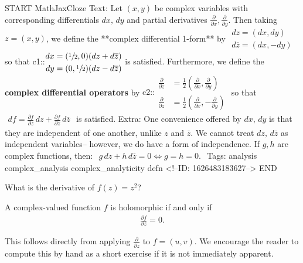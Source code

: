 \documentclass{memoir}
\begin{document}
\begin{anki}
START
MathJaxCloze
Text: Let \((x,y)\) be complex variables with corresponding differentials \(dx , \,d y\) and partial derivatives \(\frac{\partial }{\partial x} , \frac{\partial }{\partial y} \). Then taking \(z = (x,y)\), we define the **complex differential 1-form** by
\(\begin{align*}
  	dz = (dx, dy)\\
  	d \overline{z} = (dx,-dy)
  \end{align*}\)
so that
{{c1::\(\begin{align*}
      	dx = (\sfrac{1}{2},0) (dz + d \overline{z})\\
      	dy = (0, \sfrac{1}{2}) (dz - d \overline{z})
        \end{align*}\)}}
is satisfied. Furthermore, we define the \textbf{complex differential operators} by
{{c2::\(\begin{align*}
        	\frac{\partial }{\partial z} &= \frac{1}{2}\left( \frac{\partial }{\partial x} , \frac{\partial }{\partial y}  \right)\\
        	\frac{\partial }{\partial \overline{z}} &= \frac{1}{2} \left( \frac{\partial }{\partial x} , - \frac{\partial }{\partial y}  \right) 
        \end{align*}\)}} 
so that
\(\begin{align*}
  	df = \frac{\partial f}{\partial z} \,d z + \frac{\partial f}{\partial \overline{z}} \,d \overline{z}
  \end{align*}\)
is satisfied.
Extra: One convenience offered by \(dx,\,d y\) is that they are independent of one another, unlike \(z\) and \(\overline{z}\). We cannot treat \(dz,\,d \overline{z}\) as independent variables-- however, we do have a form of independence. If \(g,h\) are complex functions, then:
\(\begin{align*}
  	g \,d z + h \,d \overline{z} = 0 \iff g= h = 0.
  \end{align*}\)
Tags: analysis complex_analysis complex_analyticity defn
<!--ID: 1626483183627-->
END
\end{anki}


\begin{exmp}
	What is the derivative of \(f(z) = z^2 \)?
\end{exmp}

\begin{prop}
	A complex-valued function \(f\) is holomorphic if and only if
	\begin{align*}
		\frac{\partial f}{\partial \overline{z}} = 0.
	\end{align*}
\end{prop}
This follows directly from applying \(\frac{\partial }{\partial \overline{z}} \) to \(f = (u,v)\). We encourage the reader to compute this by hand as a short exercise if it is not immediately apparent.\\
\end{document}
